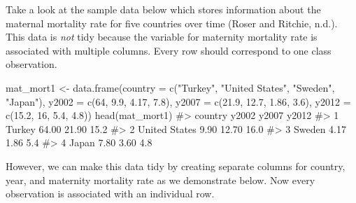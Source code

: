 \documentclass[
  letterpaper,
]{krantz}
\makeatletter
\newenvironment{Shaded}{\begin{snugshade}}{\end{snugshade}}
\newcommand{\AttributeTok}[1]{\textcolor[rgb]{0.40,0.45,0.13}{#1}}
\newcommand{\CommentTok}[1]{\textcolor[rgb]{0.37,0.37,0.37}{#1}}
\newcommand{\DecValTok}[1]{\textcolor[rgb]{0.68,0.00,0.00}{#1}}
\newcommand{\FloatTok}[1]{\textcolor[rgb]{0.68,0.00,0.00}{#1}}
\newcommand{\FunctionTok}[1]{\textcolor[rgb]{0.28,0.35,0.67}{#1}}
\newcommand{\NormalTok}[1]{\textcolor[rgb]{0.00,0.23,0.31}{#1}}
\newcommand{\OtherTok}[1]{\textcolor[rgb]{0.00,0.23,0.31}{#1}}
\newcommand{\StringTok}[1]{\textcolor[rgb]{0.13,0.47,0.30}{#1}}
\newenvironment{kframe}{%
\medskip{}
\setlength{\fboxsep}{.8em}
 \def\at@end@of@kframe{}%
 \ifinner\ifhmode%
  \def\at@end@of@kframe{\end{minipage}}%
  \begin{minipage}{\columnwidth}%
 \fi\fi%
 \def\FrameCommand##1{\hskip\@totalleftmargin \hskip-\fboxsep
 \colorbox{shadecolor}{##1}\hskip-\fboxsep
     \hskip-\linewidth \hskip-\@totalleftmargin \hskip\columnwidth}%
 \MakeFramed {\advance\hsize-\width
   \@totalleftmargin\z@ \linewidth\hsize
   \@setminipage}}%
 {\par\unskip\endMakeFramed%
 \at@end@of@kframe}
\renewenvironment{Shaded}{\begin{kframe}}{\end{kframe}}
\makeatother
\begin{document}
Take a look at the sample data below which stores information about the
maternal mortality rate for five countries over time (Roser and Ritchie,
n.d.). This data is \emph{not} tidy because the variable for maternity
mortality rate is associated with multiple columns. Every row should
correspond to one class observation.

\begin{Shaded}
\begin{Highlighting}[]
\NormalTok{mat\_mort1 }\OtherTok{\textless{}{-}} \FunctionTok{data.frame}\NormalTok{(}\AttributeTok{country =} \FunctionTok{c}\NormalTok{(}\StringTok{"Turkey"}\NormalTok{, }\StringTok{"United States"}\NormalTok{, }\StringTok{"Sweden"}\NormalTok{, }
                                    \StringTok{"Japan"}\NormalTok{),}
                       \AttributeTok{y2002 =} \FunctionTok{c}\NormalTok{(}\DecValTok{64}\NormalTok{, }\FloatTok{9.9}\NormalTok{, }\FloatTok{4.17}\NormalTok{, }\FloatTok{7.8}\NormalTok{),}
                       \AttributeTok{y2007 =} \FunctionTok{c}\NormalTok{(}\FloatTok{21.9}\NormalTok{, }\FloatTok{12.7}\NormalTok{, }\FloatTok{1.86}\NormalTok{, }\FloatTok{3.6}\NormalTok{),}
                       \AttributeTok{y2012 =} \FunctionTok{c}\NormalTok{(}\FloatTok{15.2}\NormalTok{, }\DecValTok{16}\NormalTok{, }\FloatTok{5.4}\NormalTok{, }\FloatTok{4.8}\NormalTok{))}
\FunctionTok{head}\NormalTok{(mat\_mort1)}
\CommentTok{\#\textgreater{}         country y2002 y2007 y2012}
\CommentTok{\#\textgreater{} 1        Turkey 64.00 21.90  15.2}
\CommentTok{\#\textgreater{} 2 United States  9.90 12.70  16.0}
\CommentTok{\#\textgreater{} 3        Sweden  4.17  1.86   5.4}
\CommentTok{\#\textgreater{} 4         Japan  7.80  3.60   4.8}
\end{Highlighting}
\end{Shaded}

However, we can make this data tidy by creating separate columns for
country, year, and maternity mortality rate as we demonstrate below. Now
every observation is associated with an individual row.
\end{document}
